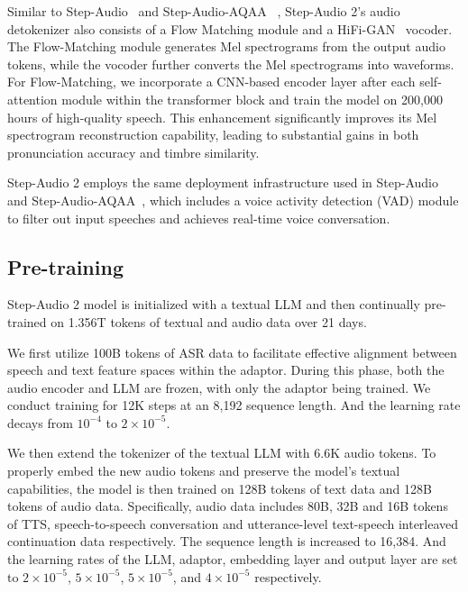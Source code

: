 Similar to Step-Audio~\cite{huang2025step} and Step-Audio-AQAA~\cite{huang2025stepaudioaqaa}
, Step-Audio 2’s audio detokenizer also consists of a Flow Matching module and a HiFi-GAN~\cite{kong2020hifigangenerativeadversarialnetworks} vocoder. The Flow-Matching module generates Mel spectrograms from the output audio tokens, while the vocoder further converts the Mel spectrograms into waveforms.
For Flow-Matching, we incorporate a CNN-based encoder layer after each self-attention module within the transformer block and train the model on 200,000 hours of high-quality speech. This enhancement significantly improves its Mel spectrogram reconstruction capability, leading to substantial gains in both pronunciation accuracy and timbre similarity.

Step-Audio 2 employs the same deployment infrastructure used in Step-Audio~\cite{huang2025step} and Step-Audio-AQAA~\cite{huang2025stepaudioaqaa}, which includes a voice activity detection (VAD) module to filter out input speeches and achieves real-time voice conversation. %







 







\subsection{Pre-training}

Step-Audio 2 model is initialized with a textual LLM and %
then continually pre-trained on 1.356T tokens of textual and audio data
over 21 days.

We first utilize
100B tokens
of ASR data to facilitate effective alignment between speech and text feature spaces within the adaptor.
During this phase, both the audio encoder and LLM are frozen, with only the adaptor being trained.
We conduct training for 12K steps at an 8,192 sequence length.
And the learning rate decays from $10^{-4}$ to $2\times10^{-5}$. 

We then extend the tokenizer of the textual LLM with 6.6K audio tokens.
To properly embed the new audio tokens and preserve the model's textual capabilities,
the model is then trained on 128B tokens of text data and 128B tokens of audio data.
Specifically, audio data includes 80B, 32B and 16B tokens of TTS, speech-to-speech conversation and utterance-level text-speech interleaved continuation data respectively.
The sequence length is increased to 16,384.
And the learning rates of the LLM,
adaptor, embedding layer
and output layer
are set to $2\times10^{-5}$, 
$5\times10^{-5}$, 
$5\times10^{-5}$, 
and $4\times10^{-5}$ respectively.

